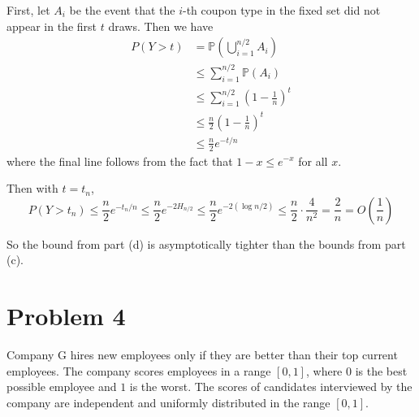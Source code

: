 \documentclass[12pt,letterpaper]{article}
\renewcommand{\P}{\mathbb{P}}
\begin{document}
\begin{enumerate}[a.]
    \color{darkblue}
        First, let $A_i$ be the event that the $i$-th coupon type in the fixed set did not appear in the first $t$ draws. Then we have
        \begin{align*}
            P(Y > t) &= \P( \bigcup_{i=1}^{n/2} A_i )\\ 
            &\leq \sum_{i=1}^{n/2} \P(A_i)\\ 
            &\leq \sum_{i=1}^{n/2} \left(1 - \frac{1}{n}\right)^t\\ 
            &\leq \frac{n}{2} \left(1 - \frac{1}{n}\right)^t\\ 
            &\leq \frac{n}{2}e^{-t/n}
        \end{align*} 
        where the final line follows from the fact that $1-x \leq e^{-x}$ for all $x$.

        Then with $t = t_n$, 
        \[P(Y > t_n) \leq \frac{n}{2}e^{-t_n/n} \leq \frac{n}{2}e^{-2H_{n/2}} \leq \frac{n}{2} e^{-2(\log n/2)} \leq \frac{n}{2} \cdot \frac{4}{n^2} = \frac{2}{n} = O\left(\frac{1}{n}\right)\]

        So the bound from part (d) is asymptotically tighter than the bounds from part (c).
    \color{black}

\end{enumerate}

\section*{Problem 4}
Company G hires new employees only if they are better than their top current employees.
The company scores employees in a range $[0,1]$, where $0$ is the best possible employee and $1$ is the worst. The scores of candidates interviewed by the company are independent and uniformly distributed in the range $[0,1]$.
\end{document}
